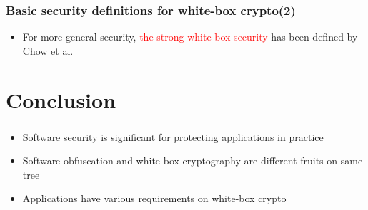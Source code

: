 \documentclass{beamer}
\begin{document}
\frame
{
\frametitle{Basic security definitions for white-box crypto(2)}
\begin{itemize}
\item For more general security, \textcolor{red}{the strong white-box security} has been defined by Chow et al.
\end{itemize}

\begin{center}
\end{center}
}

\section{Conclusion}

\frame
{
\frametitle{}

\begin{itemize}
\setlength{\itemsep}{12pt}
\item Software security is significant for protecting applications in practice

\item Software obfuscation and white-box cryptography are different fruits on same tree

\item Applications have various requirements on white-box crypto

\end{itemize}

}
\end{document}
